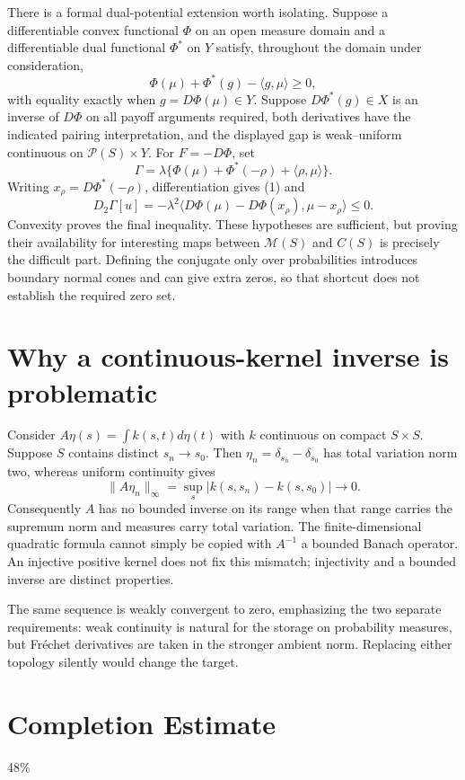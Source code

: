\documentclass[11pt]{article}
\begin{document}
There is a formal dual-potential extension worth isolating. Suppose a differentiable convex functional $\Phi$ on an open measure domain and a differentiable dual functional $\Phi^*$ on $Y$ satisfy, throughout the domain under consideration,
\[
 \Phi(\mu)+\Phi^*(g)-\langle g,\mu\rangle\geq0,
\]
with equality exactly when $g=D\Phi(\mu)\in Y$. Suppose $D\Phi^*(g)\in X$ is an inverse of $D\Phi$ on all payoff arguments required, both derivatives have the indicated pairing interpretation, and the displayed gap is weak--uniform continuous on $\mathcal P(S)\times Y$. For $F=-D\Phi$, set
\[
 \Gamma=\lambda\{\Phi(\mu)+\Phi^*(-\rho)+\langle\rho,\mu\rangle\}.
\]
Writing $x_\rho=D\Phi^*(-\rho)$, differentiation gives (1) and
\[
 D_2\Gamma[u]
 =-\lambda^2\langle D\Phi(\mu)-D\Phi(x_\rho),\mu-x_\rho\rangle\leq0.
\]
Convexity proves the final inequality. These hypotheses are sufficient, but proving their availability for interesting maps between $\mathcal M(S)$ and $C(S)$ is precisely the difficult part. Defining the conjugate only over probabilities introduces boundary normal cones and can give extra zeros, so that shortcut does not establish the required zero set.

\section*{Why a continuous-kernel inverse is problematic}
Consider $A\eta(s)=\int k(s,t)d\eta(t)$ with $k$ continuous on compact $S\times S$. Suppose $S$ contains distinct $s_n\to s_0$. Then $\eta_n=\delta_{s_n}-\delta_{s_0}$ has total variation norm two, whereas uniform continuity gives
\[
 \|A\eta_n\|_\infty
 =\sup_s|k(s,s_n)-k(s,s_0)|\longrightarrow0.
\]
Consequently $A$ has no bounded inverse on its range when that range carries the supremum norm and measures carry total variation. The finite-dimensional quadratic formula cannot simply be copied with $A^{-1}$ a bounded Banach operator. An injective positive kernel does not fix this mismatch; injectivity and a bounded inverse are distinct properties.

The same sequence is weakly convergent to zero, emphasizing the two separate requirements: weak continuity is natural for the storage on probability measures, but Fr\'echet derivatives are taken in the stronger ambient norm. Replacing either topology silently would change the target.

\section{Completion Estimate}
48\%
\end{document}
